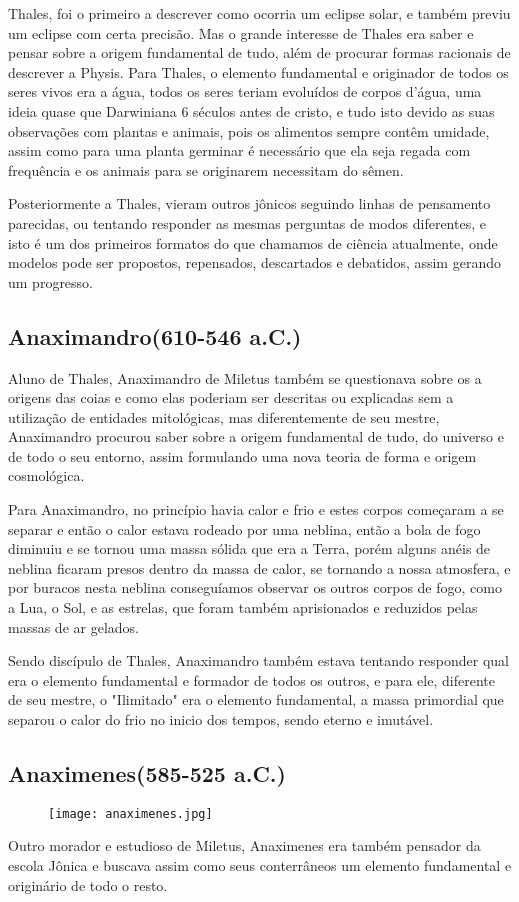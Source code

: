 Thales, foi o primeiro a descrever como ocorria um eclipse solar, e também previu um eclipse com certa precisão. Mas o grande interesse de Thales era saber e pensar sobre a origem fundamental de tudo, além de procurar formas racionais de descrever a Physis. Para Thales, o elemento fundamental e originador de todos os seres vivos era a água, todos os seres teriam evoluídos de corpos d'água, uma ideia quase que Darwiniana 6 séculos antes de cristo, e tudo isto devido as suas observações com plantas e animais, pois os alimentos sempre contêm umidade, assim como para uma planta germinar é necessário que ela seja regada com frequência e os animais para se originarem necessitam do sêmen.

Posteriormente a Thales, vieram outros jônicos seguindo linhas de pensamento parecidas, ou tentando responder as mesmas perguntas de modos diferentes, e isto é um dos primeiros formatos do que chamamos de ciência atualmente, onde modelos pode ser propostos, repensados, descartados e debatidos, assim gerando um progresso.
\subsection*{Anaximandro(610-546 a.C.)}
Aluno de Thales, Anaximandro de Miletus também se questionava sobre os a origens das coias e como elas poderiam ser descritas ou explicadas sem a utilização de entidades mitológicas, mas diferentemente de seu mestre, Anaximandro procurou saber sobre a origem fundamental de tudo, do universo e de todo o seu entorno, assim formulando uma nova teoria de forma e origem cosmológica.

Para Anaximandro, no princípio havia calor e frio e estes corpos começaram a se separar e então o calor estava rodeado por uma neblina, então a bola de fogo diminuiu e se tornou uma massa sólida que era a Terra, porém alguns anéis de neblina ficaram presos dentro da massa de calor, se tornando a nossa atmosfera, e por buracos nesta neblina conseguíamos observar os outros corpos de fogo, como a Lua, o Sol, e as estrelas, que foram também aprisionados e reduzidos pelas massas de ar gelados.

Sendo discípulo de Thales, Anaximandro também estava tentando responder qual era o elemento fundamental e formador de todos os outros, e para ele, diferente de seu mestre, o "Ilimitado" era o elemento fundamental, a massa primordial que separou o calor do frio no inicio dos tempos, sendo eterno e imutável.

\subsection*{Anaximenes(585-525 a.C.)}
\begin{figure}[!htb]
	\centering
	\texttt{[image: anaximenes.jpg]}
	
\end{figure}
Outro morador e estudioso de Miletus, Anaximenes era também pensador da escola Jônica e buscava assim como seus conterrâneos um elemento fundamental e originário de todo o resto.

